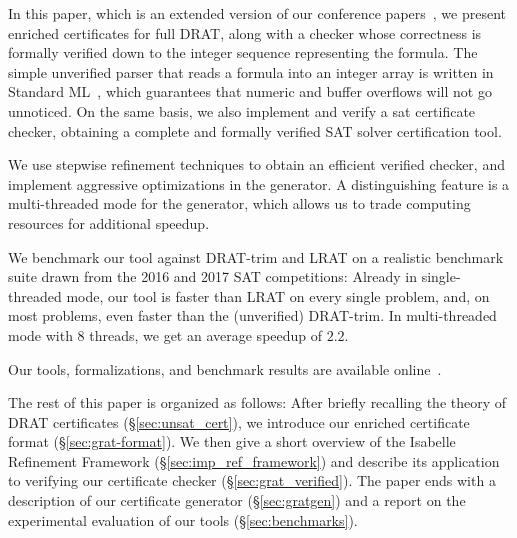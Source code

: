 \documentclass[smallcondensed]{svjour3}     %
\begin{document}
% 
% 

In this paper, which is an extended version of our conference papers~\cite{La17_CADE,La17_SAT}, we present enriched certificates for full DRAT, along with a checker whose correctness is formally verified down to the integer sequence 
representing the formula. 
The simple unverified parser that reads a formula into an integer array is written in Standard ML~\cite{MHMT97}, which guarantees that numeric and buffer overflows will 
not go unnoticed. On the same basis, we also implement and verify a sat certificate checker, obtaining a complete and formally verified SAT solver certification tool.

We use stepwise refinement techniques to obtain an efficient verified checker, and implement aggressive optimizations in the generator.
A distinguishing feature is a multi-threaded mode for the generator, which allows us to trade computing resources for additional speedup.

We benchmark our tool against DRAT-trim and LRAT on a realistic benchmark suite drawn from the 2016 and 2017 SAT 
competitions: Already in single-threaded mode, our tool is faster than LRAT on every single problem, and, on most problems, even faster than the (unverified) DRAT-trim.
In multi-threaded mode with 8 threads, we get an average speedup of $2.2$.

Our tools, formalizations, and benchmark results are available online~\cite{GRAT-homepage}.

The rest of this paper is organized as follows: 
After briefly recalling the theory of DRAT certificates (\S\ref{sec:unsat_cert}), we introduce our enriched certificate format (\S\ref{sec:grat-format}).
We then give a short overview of the Isabelle Refinement Framework (\S\ref{sec:imp_ref_framework})
and describe its application to verifying our certificate checker (\S\ref{sec:grat_verified}). 
The paper ends with a description of our certificate generator (\S\ref{sec:gratgen}) and a report on the experimental evaluation 
of our tools (\S\ref{sec:benchmarks}).
\end{document}
